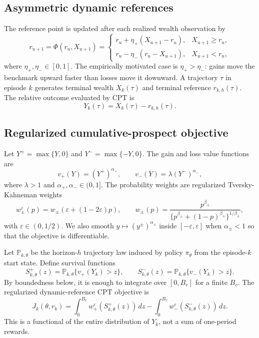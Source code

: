 \documentclass[11pt]{article}
\newcommand{\Pp}{\mathbb P}
\newcommand{\1}{\mathbf 1}
\newcommand{\CPT}{\ensuremath{\mathrm{CPT}}\xspace}
\newcommand{\eps}{\varepsilon}
\newcommand{\etaP}{\eta_{+}}
\newcommand{\etaM}{\eta_{-}}
\begin{document}
\subsection{Asymmetric dynamic references}

The reference point is updated after each realized wealth observation by
\begin{equation}\label{eq:reference-update}
 r_{u+1}=\Phi(r_u,X_{u+1})=
 \begin{cases}
 r_u+\etaP(X_{u+1}-r_u), & X_{u+1}\ge r_u,\\[2pt]
 r_u-\etaM(r_u-X_{u+1}), & X_{u+1}<r_u,
 \end{cases}
\end{equation}
where $\etaP,\etaM\in[0,1]$.  The empirically motivated case is $\etaP>\etaM$: gains move the benchmark upward faster than losses move it downward.  A trajectory $\tau$ in episode $k$ generates terminal wealth $X_k(\tau)$ and terminal reference $r_{k,h}(\tau)$.  The relative outcome evaluated by \CPT is
\begin{equation}\label{eq:relative-outcome}
 Y_k(\tau)=X_k(\tau)-r_{k,h}(\tau).
\end{equation}

\subsection{Regularized cumulative-prospect objective}

Let $Y^+=\max\{Y,0\}$ and $Y^-=\max\{-Y,0\}$.  The gain and loss value functions are
\begin{equation}\label{eq:value-functions}
 v_+(Y)=(Y^+)^{\alpha_+},\qquad
 v_-(Y)=\lambda(Y^-)^{\alpha_-},
\end{equation}
where $\lambda>1$ and $\alpha_+,\alpha_-\in(0,1]$.  The probability weights are regularized Tversky-Kahneman weights
\begin{equation}\label{eq:prob-weights}
 w_\pm^\eps(p)=w_\pm(\eps+(1-2\eps)p),\qquad
 w_\pm(p)=\frac{p^{\beta_\pm}}{\{p^{\beta_\pm}+(1-p)^{\beta_\pm}\}^{1/\beta_\pm}},
\end{equation}
with $\eps\in(0,1/2)$.  We also smooth $y\mapsto (y^\pm)^{\alpha_\pm}$ inside $[-\eps,\eps]$ when $\alpha_\pm<1$ so that the objective is differentiable.

Let $\Pp_{k,\theta}$ be the horizon-$h$ trajectory law induced by policy $\pi_\theta$ from the episode-$k$ start state.  Define survival functions
\[
 S^+_{k,\theta}(z)=\Pp_{k,\theta}\{v_+(Y_k)>z\},\qquad
 S^-_{k,\theta}(z)=\Pp_{k,\theta}\{v_-(Y_k)>z\}.
\]
By boundedness below, it is enough to integrate over $[0,B_v]$ for a finite $B_v$.  The regularized dynamic-reference \CPT objective is
\begin{equation}\label{eq:cpt-objective}
 J_k(\theta,r_k)
 =\int_0^{B_v} w_+^\eps(S^+_{k,\theta}(z))\,dz
 -\int_0^{B_v} w_-^\eps(S^-_{k,\theta}(z))\,dz.
\end{equation}
This is a functional of the entire distribution of $Y_k$, not a sum of one-period rewards.
\end{document}
